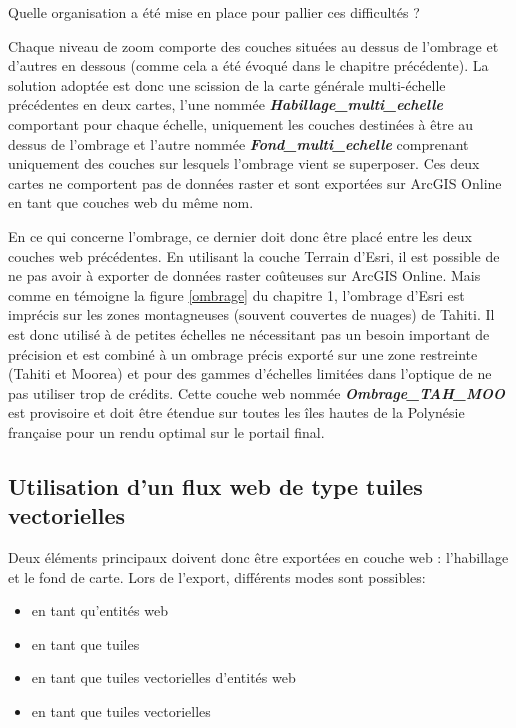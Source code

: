 \begin{center}
    Quelle organisation a été mise en place pour pallier ces difficultés ?
\end{center}

Chaque niveau de zoom comporte des couches situées au dessus de l'ombrage et d'autres en dessous (comme cela a été évoqué dans le chapitre précédente). La solution adoptée est donc une scission de la carte générale multi-échelle précédentes en deux cartes, l'une nommée \textbf{\textit{Habillage\_multi\_echelle}} comportant pour chaque échelle, uniquement les couches destinées à être au dessus de l'ombrage et l'autre nommée  \textbf{\textit{Fond\_multi\_echelle}} comprenant uniquement des couches sur lesquels l'ombrage vient se superposer.
Ces deux cartes ne comportent pas de données raster et sont exportées sur ArcGIS Online en tant que couches web du même nom.

En ce qui concerne l'ombrage, ce dernier doit donc être placé entre les deux couches web précédentes. En utilisant la couche Terrain d'Esri, il est possible de ne pas avoir à exporter de données raster coûteuses sur ArcGIS Online. Mais comme en témoigne la figure \ref{ombrage} du chapitre 1, l'ombrage d'Esri est imprécis sur les zones montagneuses (souvent couvertes de nuages) de Tahiti. Il est donc utilisé à de petites échelles ne nécessitant pas un besoin important de précision et est combiné à un ombrage précis exporté sur une zone restreinte (Tahiti et Moorea) et pour des gammes d'échelles limitées dans l'optique de ne pas utiliser trop de crédits.  Cette couche web nommée \textbf{\textit{Ombrage\_TAH\_MOO}} est provisoire et doit être étendue sur toutes les îles hautes de la Polynésie française pour un rendu optimal sur le portail final.


\subsection{Utilisation d'un flux web de type tuiles vectorielles}

Deux éléments principaux doivent donc être exportées en couche web : l'habillage et le fond de carte.
Lors de l'export, différents modes sont possibles:
\begin{itemize}
    \item en tant qu'entités web
    \item en tant que tuiles
    \item en tant que tuiles vectorielles d'entités web
    \item en tant que tuiles vectorielles
\end{itemize}


